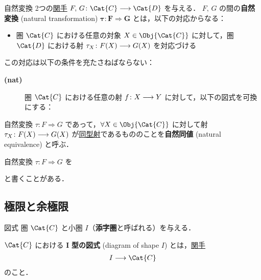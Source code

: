 \documentclass[TQFT_main]{subfiles}
\begin{document}
\begin{mydef}[label=def:nat]{自然変換}
    2つの\hyperref[def:functor]{関手} $F,\, G \colon \Cat{C} \lto \Cat{D}$ を与える．
    $F,\, G$ の間の\textbf{自然変換} (natural transformation) $\bm{\tau \colon F \Longrightarrow G}$ とは，以下の対応からなる：
    \begin{itemize}
        \item 圏 $\Cat{C}$ における任意の対象 $X \in \Obj{\Cat{C}}$ に対して，圏 $\Cat{D}$ における射 $\tau_X \colon F(X) \longrightarrow G(X)$ を対応づける
    \end{itemize}
    この対応は以下の条件を充たさねばならない：
    \begin{description}
        \item[\textbf{(nat)}]  
        圏 $\Cat{C}$ における任意の射 $f \colon X \longrightarrow Y$ に対して，以下の図式を可換にする：
        \begin{center}
        \end{center}
    \end{description}
    
    \tcblower 

    自然変換 $\tau \colon F \Longrightarrow G$ であって，$\forall X \in \Obj{\Cat{C}}$ に対して射 $\tau_X \colon F(X) \longrightarrow G(X)$ が\hyperref[def:iso]{同型射}であるもののことを\textbf{自然同値} (natural equivalence) と呼ぶ．
\end{mydef}

自然変換 $\tau \colon F \Longrightarrow G$ を
\begin{center}
\end{center}
と書くことがある．    

\subsection{極限と余極限}

\begin{mydef}[label=def:diagram]{図式}
    圏 $\Cat{C}$ と小圏 $I$（\textbf{添字圏}と呼ばれる）を与える．
    
    $\Cat{C}$ における $\bm{I}$ \textbf{型の図式} (diagram of shape $I$) とは，\hyperref[def:functor]{関手}
    \begin{align}
        I \lto \Cat{C}
    \end{align}
    のこと．
\end{mydef}
\end{document}
